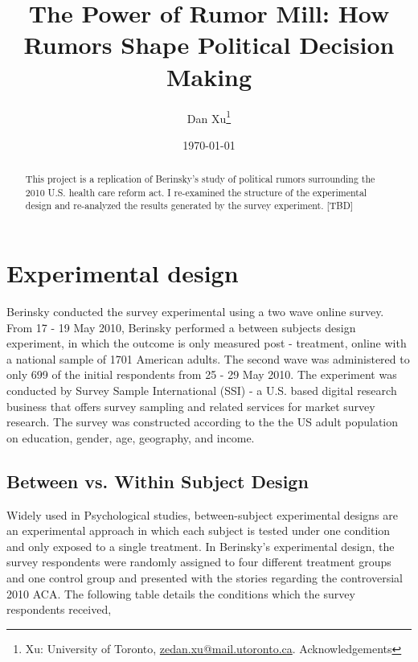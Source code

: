 \documentclass[AER]{AEA}
\begin{document}
\title{The Power of Rumor Mill: How Rumors Shape Political Decision
Making}


\author{
  Dan Xu\thanks{
  Xu: University of
Toronto, \href{mailto:zedan.xu@mail.utoronto.ca}{zedan.xu@mail.utoronto.ca}.
  Acknowledgements
}
}

\date{\today}

\begin{abstract}
This project is a replication of Berinsky's study of political rumors
surrounding the 2010 U.S. health care reform act. I re-examined the
structure of the experimental design and re-analyzed the results
generated by the survey experiment. {[}TBD{]}
\end{abstract}


\maketitle

\section{Experimental design}

Berinsky conducted the survey experimental using a two wave online
survey. From 17 - 19 May 2010, Berinsky performed a between subjects
design experiment, in which the outcome is only measured post -
treatment, online with a national sample of 1701 American adults. The
second wave was administered to only 699 of the initial respondents from
25 - 29 May 2010. The experiment was conducted by Survey Sample
International (SSI) - a U.S. based digital research business that offers
survey sampling and related services for market survey research. The
survey was constructed according to the the US adult population on
education, gender, age, geography, and income.

\subsection{Between vs. Within Subject Design}

Widely used in Psychological studies, between-subject experimental
designs are an experimental approach in which each subject is tested
under one condition and only exposed to a single treatment. In
Berinsky's experimental design, the survey respondents were randomly
assigned to four different treatment groups and one control group and
presented with the stories regarding the controversial 2010 ACA. The
following table details the conditions which the survey respondents
received,
\end{document}
